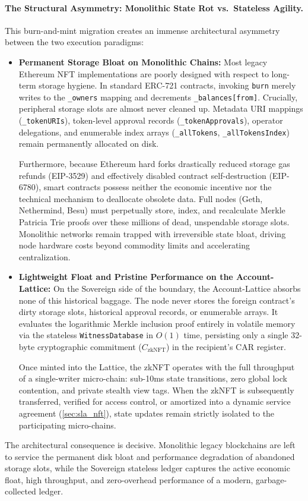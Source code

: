 \documentclass[a4paper,11pt,twoside,parskip=half-,headings=small]{scrartcl}
\newcommand{\code}[1]{\texttt{#1}}
\begin{document}
\paragraph{The Structural Asymmetry: Monolithic State Rot vs.\ Stateless Agility.}
This burn-and-mint migration creates an immense architectural asymmetry between the two execution paradigms:
\begin{itemize}[nosep]
  \item \textbf{Permanent Storage Bloat on Monolithic Chains:}
  Most legacy Ethereum NFT implementations are poorly designed with respect to long-term storage hygiene. In standard ERC-721 contracts, invoking \code{burn} merely writes  to the \code{\_owners} mapping and decrements \code{\_balances[from]}. Crucially, peripheral storage slots are almost never cleaned up. Metadata URI mappings (\code{\_tokenURIs}), token-level approval records (\code{\_tokenApprovals}), operator delegations, and enumerable index arrays (\code{\_allTokens}, \code{\_allTokensIndex}) remain permanently allocated on disk.

  Furthermore, because Ethereum hard forks drastically reduced storage gas refunds (EIP-3529) and effectively disabled contract self-destruction (EIP-6780), smart contracts possess neither the economic incentive nor the technical mechanism to deallocate obsolete data. Full nodes (Geth, Nethermind, Besu) must perpetually store, index, and recalculate Merkle Patricia Trie proofs over these millions of dead, unspendable storage slots. Monolithic networks remain trapped with irreversible state bloat, driving node hardware costs beyond commodity limits and accelerating centralization.

  \item \textbf{Lightweight Float and Pristine Performance on the Account-Lattice:}
  On the Sovereign side of the boundary, the Account-Lattice absorbs none of this historical baggage. The node never stores the foreign contract's dirty storage slots, historical approval records, or enumerable arrays. It evaluates the logarithmic Merkle inclusion proof entirely in volatile memory via the stateless \code{WitnessDatabase} in $O(1)$ time, persisting only a single 32-byte cryptographic commitment ($C_{\text{zkNFT}}$) in the recipient's CAR register.

  Once minted into the Lattice, the zkNFT operates with the full throughput of a single-writer micro-chain: sub-10ms state transitions, zero global lock contention, and private stealth view tags. When the zkNFT is subsequently transferred, verified for access control, or amortized into a dynamic service agreement (\cref{sec:sla_nft}), state updates remain strictly isolated to the participating micro-chains.
\end{itemize}
The architectural consequence is decisive. Monolithic legacy blockchains are left to service the permanent disk bloat and performance degradation of abandoned storage slots, while the Sovereign stateless ledger captures the active economic float, high throughput, and zero-overhead performance of a modern, garbage-collected ledger.
\end{document}

